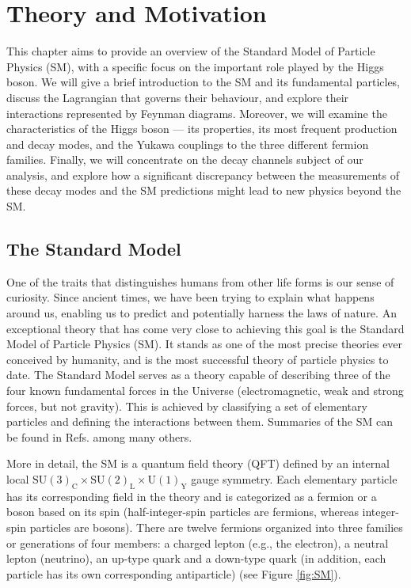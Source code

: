 \chapter[Theory and Motivation]{Theory and Motivation}\label{chap:theory_motivation}

This chapter aims to provide an overview of the Standard Model of Particle Physics (SM), with a specific focus on the important role played by the Higgs boson. We will give a brief introduction to the SM and its fundamental particles, discuss the Lagrangian that governs their behaviour, and explore their interactions represented by Feynman diagrams. Moreover, we will examine the characteristics of the Higgs boson --- its properties, its most frequent production and decay modes, and the Yukawa couplings to the three different fermion families. Finally, we will concentrate on the decay channels subject of our analysis, and explore how a significant discrepancy between the measurements of these decay modes and the SM predictions might lead to new physics beyond the SM.

\section{The Standard Model}\label{sec:SM}

One of the traits that distinguishes humans from other life forms is our sense of curiosity. Since ancient times, we have been trying to explain what happens around us, enabling us to predict and potentially harness the laws of nature. An exceptional theory that has come very close to achieving this goal is the Standard Model of Particle Physics (SM). It stands as one of the most precise theories ever conceived by humanity, and is the most successful theory of particle physics to date. The Standard Model serves as a theory capable of describing three of the four known fundamental forces in the Universe (electromagnetic, weak and strong forces, but not gravity). This is achieved by classifying a set of elementary particles and defining the interactions between them. Summaries of the SM can be found in Refs. \cite{Perkins:1982xb, Peskin:1995ev, Schwartz:2014sze} among many others.

More in detail, the SM is a quantum field theory (QFT) defined by an internal local $\text{SU}(3)_{\text{C}}\times \text{SU}(2)_{\text{L}}\times \text{U}(1)_{\text{Y}}$ gauge symmetry. Each elementary particle has its corresponding field in the theory and is categorized as a fermion or a boson based on its spin (half-integer-spin particles are fermions, whereas integer-spin particles are bosons). There are twelve fermions organized into three families or generations of four members: a charged lepton (e.g., the electron), a neutral lepton (neutrino), an up-type quark and a down-type quark (in addition, each particle has its own corresponding antiparticle) (see Figure \ref{fig:SM}).


